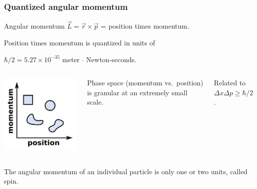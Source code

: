 \documentclass[compress]{beamer}
\begin{document}
\begin{frame}
\frametitle{Quantized angular momentum}

Angular momentum $\vec{L} = \vec{r} \times \vec{p}$ = position times momentum.

\vspace{0.2 cm}
Position times momentum is quantized in units of

\hfill $\hbar/2 = 5.27 \times 10^{-35}$ meter $\cdot$ Newton-seconds.

\begin{columns}
\includegraphics[width=\linewidth]{equal_area.png}

Phase space (momentum vs.\ position) is granular at an extremely small scale.

\vspace{0.3 cm}
Related to $\Delta x \Delta p \ge \hbar/2$.

\end{columns}

\vfill
The angular momentum of an individual particle is only one or two units, called spin.
\end{frame}
\end{document}
